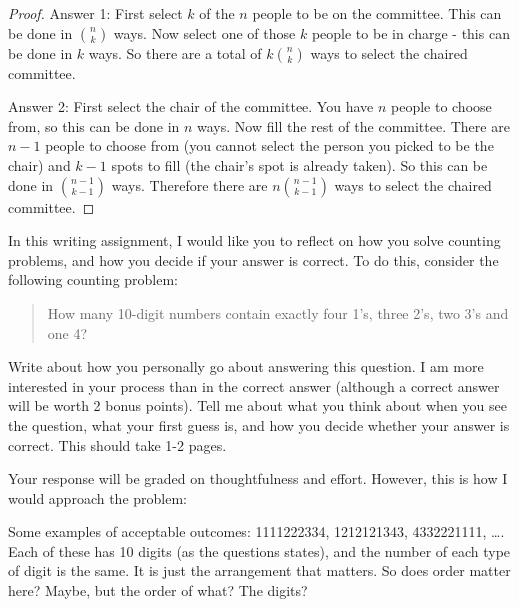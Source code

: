 \documentclass[11pt]{exam}
\begin{document}
\begin{questions}
\begin{parts}
\begin{solution}
\begin{proof}
      Answer 1: First select $k$ of the $n$ people to be on the committee.  This can be done in ${n \choose k}$ ways.  Now select one of those $k$ people to be in charge - this can be done in $k$ ways.  So there are a total of $k {n \choose k}$ ways to select the chaired committee.
      
      Answer 2: First select the chair of the committee.  You have $n$ people to choose from, so this can be done in $n$ ways.  Now fill the rest of the committee.  There are $n-1$ people to choose from (you cannot select the person you picked to be the chair) and $k-1$ spots to fill (the chair's spot is already taken).  So this can be done in ${n-1 \choose k-1}$ ways.  Therefore there are $n{n-1 \choose k-1}$ ways to select the chaired committee.
    \end{proof}

  \end{solution}

\end{parts}


%

\question[8] In this writing assignment, I would like you to reflect on how you solve counting problems, and how you decide if your answer is correct.  To do this, consider the following counting problem:

\begin{quote}
	How many 10-digit numbers contain exactly four 1's, three 2's, two 3's and one 4?
\end{quote} 

Write about how you personally go about answering this question.  I am more interested in your process than in the correct answer (although a correct answer will be worth 2 bonus points).  Tell me about what you think about when you see the question, what your first guess is, and how you decide whether your answer is correct.  This should take 1-2 pages.
\begin{solution}
Your response will be graded on thoughtfulness and effort.  However, this is how I would approach the problem:

Some examples of acceptable outcomes: 1111222334, 1212121343, 4332221111, \ldots.  Each of these has 10 digits (as the questions states), and the number of each type of digit is the same.  It is just the arrangement that matters.  So does order matter here?  Maybe, but the order of what?  The digits?  


\end{solution}
\end{questions}
\end{document}
